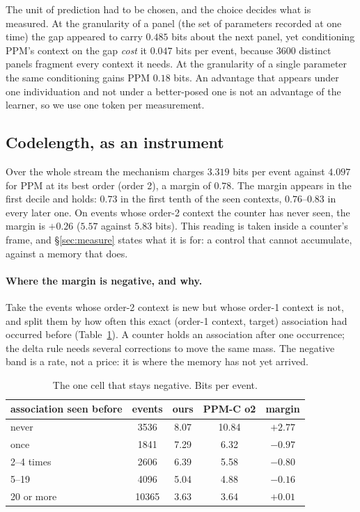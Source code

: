 \documentclass[11pt,a4paper]{article}
\theoremstyle{plain}
\theoremstyle{definition}
\theoremstyle{remark}
\begin{document}
The unit of prediction had to be chosen, and the choice decides what is
measured. At the granularity of a panel (the set of parameters recorded at one
time) the gap appeared to carry $0.485$ bits about the next panel, yet
conditioning PPM's context on the gap \emph{cost} it $0.047$ bits per event,
because 3600 distinct panels fragment every context it needs. At the
granularity of a single parameter the same conditioning gains PPM $0.18$ bits.
An advantage that appears under one individuation and not under a better-posed
one is not an advantage of the learner, so we use one token per measurement.

\subsection{Codelength, as an instrument}

Over the whole stream the mechanism charges $3.319$ bits per event against
$4.097$ for PPM at its best order (order 2), a margin of $0.78$. The margin
appears in the first decile and holds: $0.73$ in the first tenth of the seen
contexts, $0.76$--$0.83$ in every later one. On events whose order-2 context the
counter has never seen, the margin is $+0.26$ ($5.57$ against $5.83$ bits). This
reading is taken inside a counter's frame, and \S\ref{sec:measure} states what
it is for: a control that cannot accumulate, against a memory that does.

\paragraph{Where the margin is negative, and why.} Take the events whose
order-2 context is new but whose order-1 context is not, and split them by how
often this exact (order-1 context, target) association had occurred before
(Table~\ref{tab:assoc}). A counter holds an association after one occurrence;
the delta rule needs several corrections to move the same mass. The negative
band is a rate, not a price: it is where the memory has not yet arrived.

\begin{table}[h]
\centering
\small
\begin{tabular}{lcccc}
\toprule
association seen before & events & ours & PPM-C o2 & margin\\
\midrule
never & 3536 & 8.07 & 10.84 & $+2.77$\\
once & 1841 & 7.29 & 6.32 & $-0.97$\\
2--4 times & 2606 & 6.39 & 5.58 & $-0.80$\\
5--19 & 4096 & 5.04 & 4.88 & $-0.16$\\
20 or more & 10365 & 3.63 & 3.64 & $+0.01$\\
\bottomrule
\end{tabular}
\caption{The one cell that stays negative. Bits per event.}
\label{tab:assoc}
\end{table}
\end{document}
